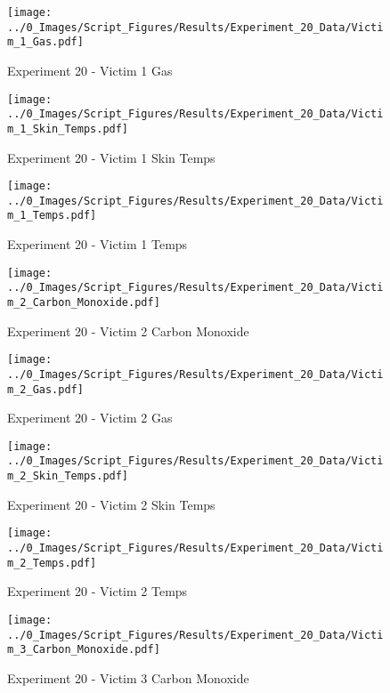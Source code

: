 	\begin{figure}[H]
		\centering
		\texttt{[image: ../0\_Images/Script\_Figures/Results/Experiment\_20\_Data/Victim\_1\_Gas.pdf]}
		\caption[]{Experiment 20 - Victim 1 Gas}
	\end{figure}
 
	\clearpage

	\begin{figure}[H]
		\centering
		\texttt{[image: ../0\_Images/Script\_Figures/Results/Experiment\_20\_Data/Victim\_1\_Skin\_Temps.pdf]}
		\caption[]{Experiment 20 - Victim 1 Skin Temps}
	\end{figure}
 

	\begin{figure}[H]
		\centering
		\texttt{[image: ../0\_Images/Script\_Figures/Results/Experiment\_20\_Data/Victim\_1\_Temps.pdf]}
		\caption[]{Experiment 20 - Victim 1 Temps}
	\end{figure}
 
	\clearpage

	\begin{figure}[H]
		\centering
		\texttt{[image: ../0\_Images/Script\_Figures/Results/Experiment\_20\_Data/Victim\_2\_Carbon\_Monoxide.pdf]}
		\caption[]{Experiment 20 - Victim 2 Carbon Monoxide}
	\end{figure}
 

	\begin{figure}[H]
		\centering
		\texttt{[image: ../0\_Images/Script\_Figures/Results/Experiment\_20\_Data/Victim\_2\_Gas.pdf]}
		\caption[]{Experiment 20 - Victim 2 Gas}
	\end{figure}
 
	\clearpage

	\begin{figure}[H]
		\centering
		\texttt{[image: ../0\_Images/Script\_Figures/Results/Experiment\_20\_Data/Victim\_2\_Skin\_Temps.pdf]}
		\caption[]{Experiment 20 - Victim 2 Skin Temps}
	\end{figure}
 

	\begin{figure}[H]
		\centering
		\texttt{[image: ../0\_Images/Script\_Figures/Results/Experiment\_20\_Data/Victim\_2\_Temps.pdf]}
		\caption[]{Experiment 20 - Victim 2 Temps}
	\end{figure}
 
	\clearpage

	\begin{figure}[H]
		\centering
		\texttt{[image: ../0\_Images/Script\_Figures/Results/Experiment\_20\_Data/Victim\_3\_Carbon\_Monoxide.pdf]}
		\caption[]{Experiment 20 - Victim 3 Carbon Monoxide}
	\end{figure}
 

